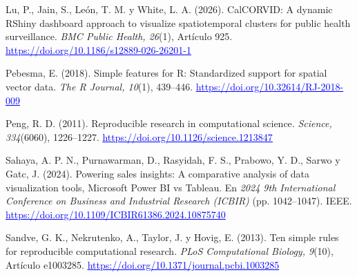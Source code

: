 \documentclass[12pt,a4paper]{article}
\newcommand{\enlace}[2]{\href{#1}{\textcolor{blue}{#2}}}
\begin{document}
\begin{thebibliography}{99}
Lu, P., Jain, S., León, T. M. y White, L. A. (2026). CalCORVID: A dynamic RShiny dashboard approach to
visualize spatiotemporal clusters for public health surveillance. \emph{BMC Public Health, 26}(1),
Artículo 925. \enlace{https://doi.org/10.1186/s12889-026-26201-1}{\uline{https:/}\allowbreak \uline{/}\allowbreak \uline{doi.}\allowbreak \uline{org/}\allowbreak \uline{10.}\allowbreak \uline{1186/}\allowbreak \uline{s12889-}\allowbreak \uline{026-}\allowbreak \uline{26201-}\allowbreak \uline{1}}

Pebesma, E. (2018). Simple features for R: Standardized support for spatial vector data. \emph{The R
Journal, 10}(1), 439--446. \enlace{https://doi.org/10.32614/RJ-2018-009}{\uline{https:/}\allowbreak \uline{/}\allowbreak \uline{doi.}\allowbreak \uline{org/}\allowbreak \uline{10.}\allowbreak \uline{32614/}\allowbreak \uline{RJ-}\allowbreak \uline{2018-}\allowbreak \uline{009}}

Peng, R. D. (2011). Reproducible research in computational science. \emph{Science, 334}(6060),
1226--1227. \enlace{https://doi.org/10.1126/science.1213847}{\uline{https:/}\allowbreak \uline{/}\allowbreak \uline{doi.}\allowbreak \uline{org/}\allowbreak \uline{10.}\allowbreak \uline{1126/}\allowbreak \uline{science.}\allowbreak \uline{1213847}}

Sahaya, A. P. N., Purnawarman, D., Rasyidah, F. S., Prabowo, Y. D., Sarwo y Gatc, J. (2024). Powering
sales insights: A comparative analysis of data visualization tools, Microsoft Power BI vs Tableau. En
\emph{2024 9th International Conference on Business and Industrial Research (ICBIR)} (pp. 1042--1047).
IEEE. \enlace{https://doi.org/10.1109/ICBIR61386.2024.10875740}{\uline{https:/}\allowbreak \uline{/}\allowbreak \uline{doi.}\allowbreak \uline{org/}\allowbreak \uline{10.}\allowbreak \uline{1109/}\allowbreak \uline{ICBIR61386.}\allowbreak \uline{2024.}\allowbreak \uline{10875740}}

Sandve, G. K., Nekrutenko, A., Taylor, J. y Hovig, E. (2013). Ten simple rules for reproducible
computational research. \emph{PLoS Computational Biology, 9}(10), Artículo e1003285.
\enlace{https://doi.org/10.1371/journal.pcbi.1003285}{\uline{https:/}\allowbreak \uline{/}\allowbreak \uline{doi.}\allowbreak \uline{org/}\allowbreak \uline{10.}\allowbreak \uline{1371/}\allowbreak \uline{journal.}\allowbreak \uline{pcbi.}\allowbreak \uline{1003285}}


\end{thebibliography}
\end{document}
